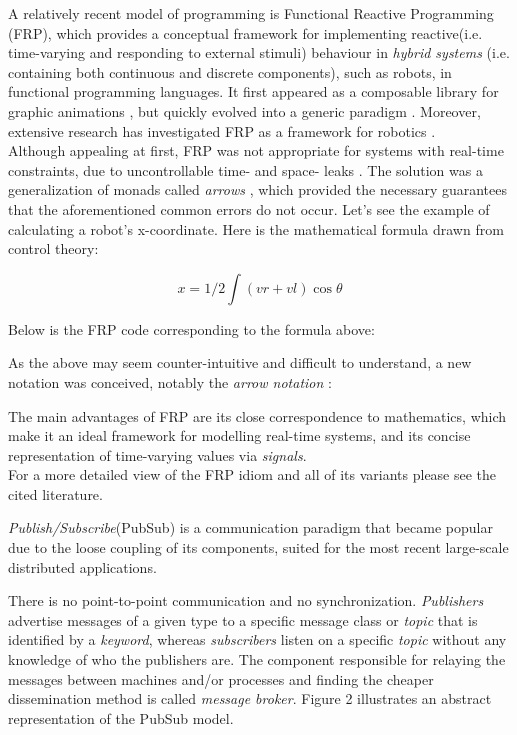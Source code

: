 \documentclass{dithesis}
\begin{document}
A relatively recent model of programming is Functional Reactive Programming (FRP), which provides a conceptual framework for implementing reactive(i.e. time-varying and responding to external stimuli) behaviour in \textit{hybrid systems} (i.e. containing both continuous and discrete components), such as robots, in functional programming languages. It first appeared as a composable library for graphic animations \cite{fran}, but quickly evolved into a generic paradigm \cite{survey_frp,real_frp,pushpull_frp}. Moreover, extensive research has investigated FRP as a framework for robotics \cite{arrows_robots,lambda_in_motion}. \\
Although appealing at first, FRP was not appropriate for systems  with real-time constraints, due to uncontrollable time- and space- leaks \cite{event_frp}. The solution was a generalization of monads called \textit{arrows} \cite{arrows}, which provided the necessary guarantees that the aforementioned common errors do not occur. Let's see the example of calculating a robot's x-coordinate. Here is the mathematical formula drawn from control theory:

$$ x = 1/2 \int (vr + vl) \cos\theta $$ 

Below is the FRP code corresponding to the formula above:


As the above may seem counter-intuitive and difficult to understand, a new notation was conceived, notably the \textit{arrow notation} \cite{arrows_notation}:


The main advantages of FRP are its close correspondence to mathematics, which make it an ideal framework for modelling real-time systems, and its concise representation of time-varying values via \textit{signals}. \\
For a more detailed view of the FRP idiom and all of its variants please see the cited literature.


\textit{Publish/Subscribe}(PubSub) is a communication paradigm that became popular due to the loose coupling of its components, suited for the most recent large-scale distributed applications.

There is no point-to-point communication and no synchronization. \textit{Publishers} advertise messages of a given type to a specific message class or \textit{topic} that is identified by a \textit{keyword}, whereas \textit{subscribers} listen on a specific \textit{topic} without any knowledge of who the publishers are. The component responsible for relaying the messages between machines and/or processes and finding the cheaper dissemination method is called \textit{message broker}. Figure 2 illustrates an abstract representation of the PubSub model.
\end{document}
